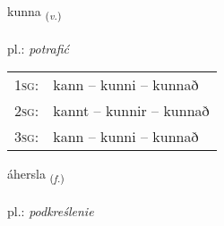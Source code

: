 \documentclass[frontgrid, backgrid]{flacards}\usepackage[]{graphicx}\usepackage[]{xcolor}
\begin{document}
\renewcommand{\flhead}{\vskip5pt \fboxsep=0pt {\small\bfseries\footnotesize Sagnorð | czasownik}}
\renewcommand{\fcfoot}{\vskip5pt \fboxsep=0pt \hspace{2pt}{\small\bfseries\footnotesize 1K}}

\renewcommand{\blhead}{\vskip5pt {\small\bfseries\footnotesize Sagnorð | czasownik }}
\renewcommand{\bcfoot}{\vskip5pt \hspace{2pt}{\small\bfseries\footnotesize 1K}}


{kunna \small{\textsubscript{(\textit{v.})}} \\[1ex] %
\textphonetic{[kʰʏna]} \\
pl.: \emph{potrafić} \\  [2ex]
\renewcommand*{\arraystretch}{0.8}
\begin{tabular}{p{1cm}l}
\textsc{1sg}: & kann -- kunni -- kunnað \\ 
\textsc{2sg}: & kannt -- kunnir -- kunnað \\ 
\textsc{3sg}: & kann -- kunni -- kunnað \\ 
\end{tabular}
}

\renewcommand{\flhead}{\vskip5pt \fboxsep=0pt {\small\bfseries\footnotesize Atviksorð | rzeczownik}}
\renewcommand{\fcfoot}{\vskip5pt \fboxsep=0pt \hspace{2pt}{\small\bfseries\footnotesize 1K}}

\renewcommand{\blhead}{\vskip5pt {\small\bfseries\footnotesize Atviksorð | rzeczownik }}
\renewcommand{\bcfoot}{\vskip5pt \hspace{2pt}{\small\bfseries\footnotesize 1K}}


{áhersla \small{\textsubscript{(\textit{f.})}} \\[1ex] %
 \\
pl.: \emph{podkreślenie} \\  [2ex]
\renewcommand*{\arraystretch}{0.8}
}
\end{document}
